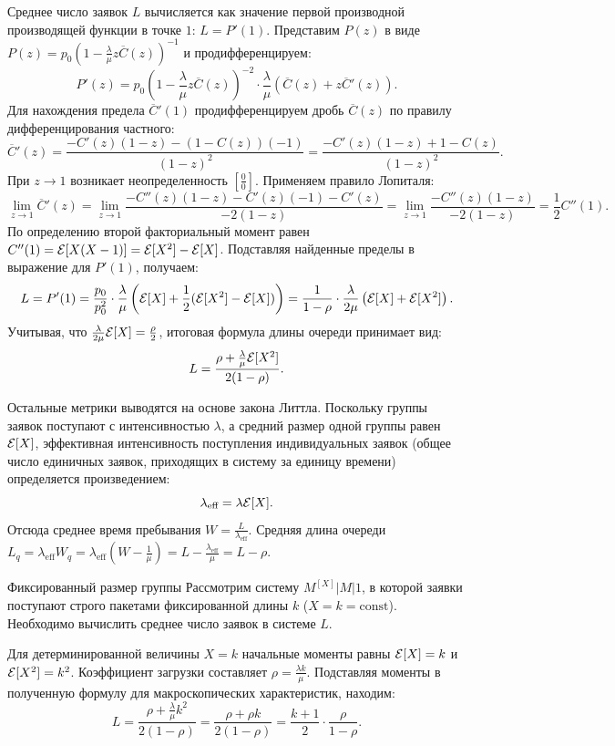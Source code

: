 \begin{tproof}
Среднее число заявок $L$ вычисляется как значение первой производной производящей функции в точке $1$: $L = P'(1)$. Представим $P(z)$ в виде $P(z) = p_0 \left( 1 - \frac{\lambda}{\mu} z \overline{C}(z) \right)^{-1}$ и продифференцируем:
$$ P'(z) = p_0 \left( 1 - \frac{\lambda}{\mu} z \overline{C}(z) \right)^{-2} \cdot \frac{\lambda}{\mu} \left( \overline{C}(z) + z \overline{C}'(z) \right). $$
Для нахождения предела $\overline{C}'(1)$ продифференцируем дробь $\overline{C}(z)$ по правилу дифференцирования частного:
$$ \overline{C}'(z) = \frac{-C'(z)(1-z) - (1-C(z))(-1)}{(1-z)^2} = \frac{-C'(z)(1-z) + 1 - C(z)}{(1-z)^2}. $$
При $z \to 1$ возникает неопределенность $\left[\frac{0}{0}\right]$. Применяем правило Лопиталя:
$$ \lim_{z \to 1} \overline{C}'(z) = \lim_{z \to 1} \frac{-C''(z)(1-z) - C'(z)(-1) - C'(z)}{-2(1-z)} = \lim_{z \to 1} \frac{-C''(z)(1-z)}{-2(1-z)} = \frac{1}{2} C''(1). $$
По определению второй факториальный момент равен $C''(1) = \mathcal{E}[X(X-1)] = \mathcal{E}[X^2] - \mathcal{E}[X]$. 
Подставляя найденные пределы в выражение для $P'(1)$, получаем:
$$ L = P'(1) = \frac{p_0}{p_0^2} \cdot \frac{\lambda}{\mu} \left( \mathcal{E}[X] + \frac{1}{2}(\mathcal{E}[X^2] - \mathcal{E}[X]) \right) = \frac{1}{1-\rho} \cdot \frac{\lambda}{2\mu} \left( \mathcal{E}[X] + \mathcal{E}[X^2] \right). $$
Учитывая, что $\frac{\lambda}{2\mu}\mathcal{E}[X] = \frac{\rho}{2}$, итоговая формула длины очереди принимает вид:
$$ L = \frac{\rho + \frac{\lambda}{\mu}\mathcal{E}[X^2]}{2(1-\rho)}. $$

Остальные метрики выводятся на основе закона Литтла. Поскольку группы заявок поступают с интенсивностью $\lambda$, а средний размер одной группы равен $\mathcal{E}[X]$, эффективная интенсивность поступления индивидуальных заявок (общее число единичных заявок, приходящих в систему за единицу времени) определяется произведением: 
$$ \lambda_{\text{eff}} = \lambda \mathcal{E}[X]. $$
Отсюда среднее время пребывания $W = \frac{L}{\lambda_{\text{eff}}}$. Средняя длина очереди $L_q = \lambda_{\text{eff}} W_q = \lambda_{\text{eff}} \left(W - \frac{1}{\mu}\right) = L - \frac{\lambda_{\text{eff}}}{\mu} = L - \rho$.
\end{tproof}

\begin{example}{Фиксированный размер группы}
Рассмотрим систему $M^{[X]}|M|1$, в которой заявки поступают строго пакетами фиксированной длины $k$ ($X = k = \text{const}$). Необходимо вычислить среднее число заявок в системе $L$.
\end{example}

\begin{eproof}
Для детерминированной величины $X = k$ начальные моменты равны $\mathcal{E}[X] = k$ и $\mathcal{E}[X^2] = k^2$. Коэффициент загрузки составляет $\rho = \frac{\lambda k}{\mu}$.
Подставляя моменты в полученную формулу для макроскопических характеристик, находим:
$$ L = \frac{\rho + \frac{\lambda}{\mu} k^2}{2(1 - \rho)} = \frac{\rho + \rho k}{2(1 - \rho)} = \frac{k+1}{2} \cdot \frac{\rho}{1 - \rho}. $$
\end{eproof}

